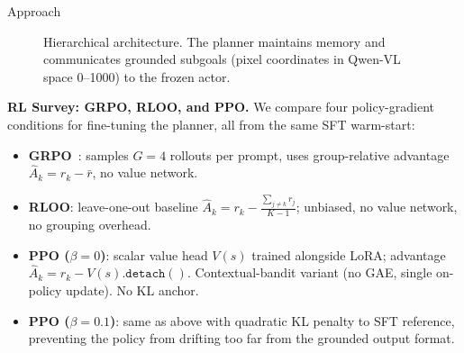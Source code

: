 \documentclass[final]{beamer}
\newlength{\colwidth}
\begin{document}
\begin{frame}[t]
\begin{columns}[t]
\begin{column}{\colwidth}
\begin{block}{Approach}
    \vspace{1em}
    \begin{figure}[t]
      \centering
      \caption{Hierarchical architecture. The planner maintains memory and communicates grounded subgoals (pixel coordinates in Qwen-VL space 0--1000) to the frozen actor.}
    \end{figure}

    \vspace{0.5em}
    \textbf{RL Survey: GRPO, RLOO, and PPO.}
    We compare four policy-gradient conditions for fine-tuning the planner, all from the same SFT warm-start:

    \begin{itemize}
      \item \textbf{GRPO}~\cite{grpo_2024}: samples $G{=}4$ rollouts per prompt, uses group-relative advantage $\hat{A}_k = r_k - \bar{r}$, no value network.
      \item \textbf{RLOO}: leave-one-out baseline $\hat{A}_k = r_k - \tfrac{\sum_{j \neq k} r_j}{K-1}$; unbiased, no value network, no grouping overhead.
      \item \textbf{PPO ($\beta{=}0$)}: scalar value head $V(s)$ trained alongside LoRA; advantage $\hat{A}_k = r_k - V(s).\texttt{detach}()$. Contextual-bandit variant (no GAE, single on-policy update). No KL anchor.
      \item \textbf{PPO ($\beta{=}0.1$)}: same as above with quadratic KL penalty to SFT reference, preventing the policy from drifting too far from the grounded output format.
    \end{itemize}


\end{block}
\end{column}
\end{columns}
\end{frame}
\end{document}
